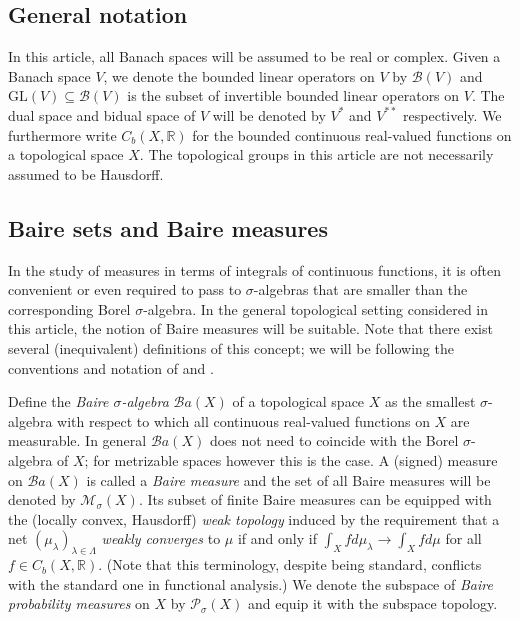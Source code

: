 \documentclass[a4paper,11pt,reqno]{amsart}
\numberwithin{equation}{section}
\theoremstyle{definition}
\theoremstyle{remark}
\theoremstyle{remark}
\begin{document}
\subsection{General notation}

In this article, all Banach spaces will be assumed to be real or complex. Given a Banach space $V$, we denote the bounded linear operators on $V$ by $\mathcal{B}(V)$ and $\text{GL}(V)\subseteq\mathcal{B}(V)$ is the subset of invertible bounded linear operators on $V$. The dual space and bidual space of $V$ will be denoted by $V^{\ast}$ and $V^{\ast\ast}$ respectively. We furthermore write $C_{b}(X,\mathbb{R})$ for the bounded continuous real-valued functions on a topological space $X$. The topological groups in this article are not necessarily assumed to be Hausdorff.

\vspace{3mm}


\subsection{Baire sets and Baire measures}

In the study of measures in terms of integrals of continuous functions, it is often convenient or even required to pass to $\sigma$-algebras that are smaller than the corresponding Borel $\sigma$-algebra. In the general topological setting considered in this article, the notion of Baire measures will be suitable. Note that there exist several (inequivalent) definitions of this concept; we will be following the conventions and notation of \cite{Bogachev} and \cite{Fremlin}.

Define the \emph{Baire $\sigma$-algebra} $\mathcal{B}a(X)$ of a topological space $X$ as the smallest $\sigma$-algebra with respect to which all continuous real-valued functions on $X$ are measurable. In general $\mathcal{B}a(X)$ does not need to coincide with the Borel $\sigma$-algebra of $X$; for metrizable spaces however this is the case. A (signed) measure on $\mathcal{B}a(X)$ is called a \emph{Baire measure} and the set of all Baire measures will be denoted by $\mathcal{M}_{\sigma}(X)$. Its subset of finite Baire measures can be equipped with the (locally convex, Hausdorff) \emph{weak topology} induced by the requirement that a net $(\mu_{\lambda})_{\lambda\in\Lambda}$ \emph{weakly converges} to $\mu$ if and only if $\int_{X}fd\mu_{\lambda}\rightarrow\int_{X}fd\mu$ for all $f\in C_{b}(X,\mathbb{R})$. (Note that this terminology, despite being standard, conflicts with the standard one in functional analysis.) We denote the subspace of \emph{Baire probability measures} on $X$ by $\mathcal{P}_{\sigma}(X)$ and equip it with the subspace topology.\\
\end{document}
